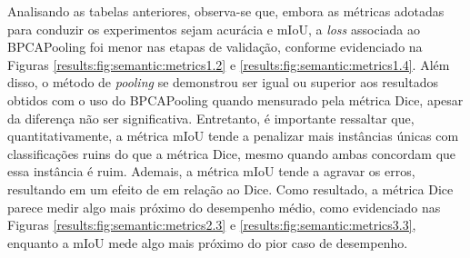 Analisando as tabelas anteriores, observa-se que, embora as métricas adotadas para conduzir os experimentos sejam acurácia e mIoU, a \textit{loss} associada ao BPCAPooling foi menor nas etapas de validação, conforme evidenciado na Figuras \ref{results:fig:semantic:metrics1.2} e \ref{results:fig:semantic:metrics1.4}. Além disso, o método de \textit{pooling} se demonstrou ser igual ou superior aos resultados obtidos com o uso do BPCAPooling quando mensurado pela métrica Dice, apesar da diferença não ser significativa. Entretanto, é importante ressaltar que, quantitativamente, a métrica mIoU tende a penalizar mais instâncias únicas com classificações ruins do que a métrica Dice, mesmo quando ambas concordam que essa instância é ruim. Ademais, a métrica mIoU tende a agravar os erros, resultando em um efeito de  em relação ao Dice. Como resultado, a métrica Dice parece medir algo mais próximo do desempenho médio, como evidenciado nas Figuras \ref{results:fig:semantic:metrics2.3} e \ref{results:fig:semantic:metrics3.3}, enquanto a mIoU mede algo mais próximo do pior caso de desempenho.

